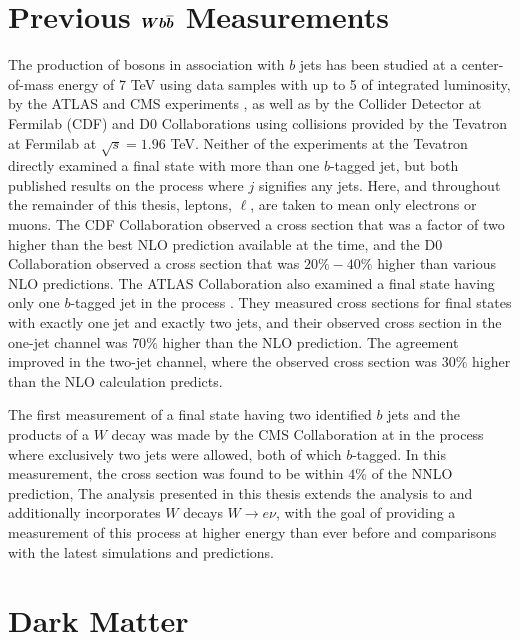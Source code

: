 \section[Previous \wbb Measurements]
{Previous $\boldsymbol{W b\overline{b}}$ Measurements}

The production of
 \w bosons
 in association with $b$ jets has been 
 studied at a center-of-mass
 energy of 7 TeV using data samples with up
 to 5 \fbinv of integrated luminosity,
 by the ATLAS and CMS experiments \cite{Chatrchyan:2013uza,Aad:2013vka}, 
 as well as by the Collider Detector at Fermilab (CDF)
 and D0 Collaborations using \ppbar collisions
 provided by the Tevatron \cite{WbbTevD0,WbbTevCDF} at  
 Fermilab at $\sqrt{s}=1.96$ TeV. 
Neither of the experiments at the Tevatron
 directly examined a final state with 
 more than one $b$-tagged jet, 
 but both published results on the 
 process \ppbarwbjlnbj where $j$ signifies
 any jets.
Here, and throughout the remainder of this thesis,
 leptons, $\ell$, are taken to mean only
 electrons or muons.
The CDF Collaboration observed a cross section
 that was a factor of two higher than the best
 NLO prediction available at the time, and the 
 D0 Collaboration observed a cross section 
 that was $20\% - 40\%$ higher than 
 various NLO predictions.
The ATLAS Collaboration also examined a
 final state having only one $b$-tagged jet 
 in the process \ppwblnb.
They measured cross sections for 
 final states with
 exactly one jet 
 and exactly two jets, and 
 their observed cross section in the 
 one-jet channel was $70\%$ higher than the NLO prediction.
The agreement improved in the two-jet channel,
 where the observed cross section was $30\%$ higher
 than the NLO calculation predicts.

The first measurement of a final state
 having two identified $b$ jets
 and the products of a $W$ decay
 was made by the CMS Collaboration 
 at  \TeV
 in the process \ppwbbmnbb where 
 exclusively two jets were allowed,
 both of which $b$-tagged.
In this measurement, the 
 cross section was found to be  
 within $4\%$ of the NNLO prediction,
The analysis presented in this
 thesis extends the \ppwbbmnbb analysis
 to  \TeV and additionally incorporates $W$
 decays $W\rightarrow e\nu$,
 with the goal of providing a
 measurement of this process at higher
 energy than ever before and comparisons
 with the latest simulations and predictions.

\section{Dark Matter}

